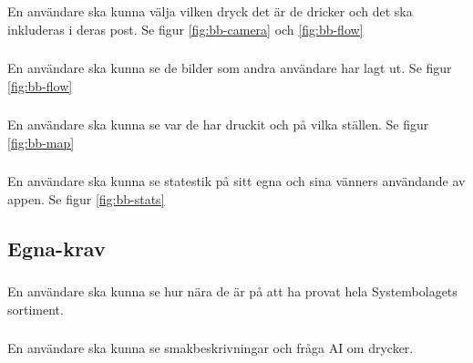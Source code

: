 \documentclass{TDP003mall}
\begin{document}
\subsubsection{}
En användare ska kunna välja vilken dryck det är de dricker och det ska inkluderas i deras post. Se figur \ref{fig:bb-camera} och \ref{fig:bb-flow}

\subsubsection{}
En användare ska kunna se de bilder som andra användare har lagt ut. Se figur \ref{fig:bb-flow}

\subsubsection{}
En användare ska kunna se var de har druckit och på vilka ställen. Se figur \ref{fig:bb-map}

\subsubsection{}
En användare ska kunna se statestik på sitt egna och sina vänners användande av appen. Se figur \ref{fig:bb-stats}

\subsection{Egna-krav}
\subsubsection{}
En användare ska kunna se hur nära de är på att ha provat hela Systembolagets sortiment.

\subsubsection{}
En användare ska kunna se smakbeskrivningar och fråga AI om drycker.
\end{document}
